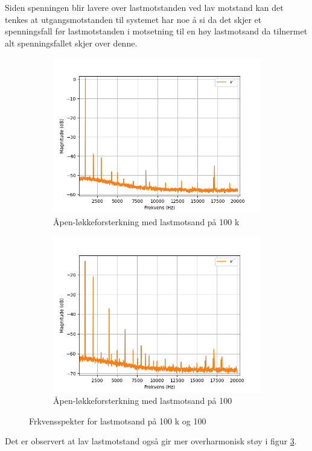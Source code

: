     Siden spenningen blir lavere over lastmotstanden ved lav motstand kan det tenkes at utgangsmotstanden  til systemet har noe å si da det skjer et spenningsfall før lastmotstanden i motsetning til en høy lastmotsand da tilnermet alt spenningsfallet skjer over denne.

    \begin{figure}[!hbt]
        \centering
        \begin{subfigure}{.5\textwidth}
            \centering
            \includegraphics[width=1\linewidth]{./Images/03Research/spektrum100k.png}
            \caption{Åpen-løkkeforsterkning med lastmotsand på 100 k\text{$\Omega$}}
            \label{fig:100kspek}
        \end{subfigure}%
        \begin{subfigure}{.5\textwidth}
            \centering
            \includegraphics[width=1\linewidth]{./Images/03Research/spektrum100.png}
            \caption{Åpen-løkkeforsterkning med lastmotsand på 100 \text{$\Omega$}}
            \label{fig:100spek}
        \end{subfigure}
        \caption{Frkvensspekter for lastmotsand på 100 k\text{$\Omega$} og 100 \text{$\Omega$}}
        \label{fig:Frkvensspekter}
    \end{figure}

Det er observert at lav lastmotstand også gir mer overharmonisk støy i figur \ref{fig:Frkvensspekter}.

